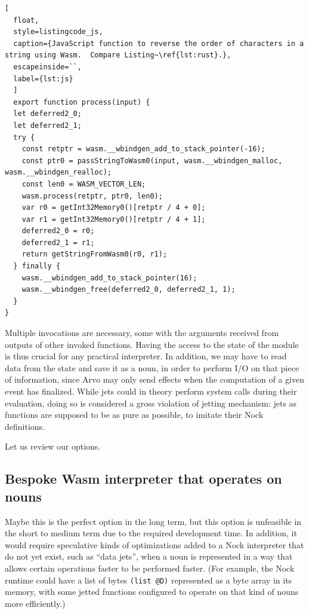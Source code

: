 \documentclass[twoside]{article}
\begin{document}
\begin{lstlisting}[
  float,
  style=listingcode_js,
  caption={JavaScript function to reverse the order of characters in a string using Wasm.  Compare Listing~\ref{lst:rust}.},
  escapeinside=``,
  label={lst:js}
  ]
  export function process(input) {
  let deferred2_0;
  let deferred2_1;
  try {
    const retptr = wasm.__wbindgen_add_to_stack_pointer(-16);
    const ptr0 = passStringToWasm0(input, wasm.__wbindgen_malloc, wasm.__wbindgen_realloc);
    const len0 = WASM_VECTOR_LEN;
    wasm.process(retptr, ptr0, len0);
    var r0 = getInt32Memory0()[retptr / 4 + 0];
    var r1 = getInt32Memory0()[retptr / 4 + 1];
    deferred2_0 = r0;
    deferred2_1 = r1;
    return getStringFromWasm0(r0, r1);
  } finally {
    wasm.__wbindgen_add_to_stack_pointer(16);
    wasm.__wbindgen_free(deferred2_0, deferred2_1, 1);
  }
}
\end{lstlisting}

\noindent
Multiple invocations are necessary, some with the arguments received from outputs of other invoked functions. Having the access to the state of the module is thus crucial for any practical interpreter. In addition, we may have to read data from the state and save it as a noun, in order to perform I/O on that piece of information, since Arvo may only send effects when the computation of a given event has finalized. While jets could in theory perform system calls during their evaluation, doing so is considered a gross violation of jetting mechanism: jets as functions are supposed to be as pure as possible, to imitate their Nock definitions.

Let us review our options.

\subsection{Bespoke Wasm interpreter that operates on nouns}

Maybe this is the perfect option in the long term, but this option is unfeasible in the short to medium term due to the required development time. In addition, it would require speculative kinds of optimizations added to a Nock interpreter that do not yet exist, such as “data jets”, when a noun is represented in a way that allows certain operations faster to be performed faster. (For example, the Nock runtime could have a list of bytes \texttt{(list @D)} represented as a byte array in its memory, with some jetted functions configured to operate on that kind of nouns more efficiently.)
\end{document}
